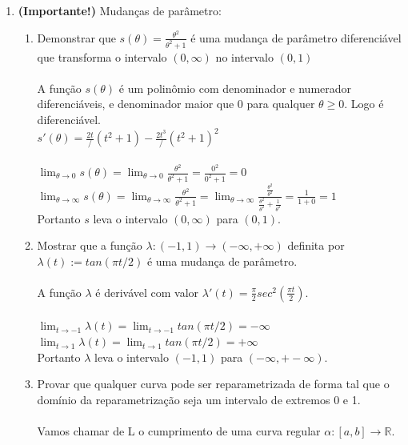 \documentclass{article}
\begin{document}
\begin{enumerate}
    \item \textbf{(Importante!)} Mudanças de parâmetro:
    \begin{enumerate}[label=(\alph*)]
        \item Demonstrar que $s(\theta) = \frac{\theta^{2}}{\theta^{2} + 1}$ é uma mudança de parâmetro diferenciável que transforma o intervalo $(0, \infty)$ no intervalo $(0, 1)$ \\
        \\
        A função $s(\theta)$ é um polinômio com denominador e numerador diferenciáveis, e denominador maior que 0 para qualquer $\theta \geq 0$. Logo é diferenciável. \\
        $s'(\theta) = \frac{2t}/{(t^{2} + 1)} - \frac{2t^{3}}/{(t^2 + 1)^{2}} $ \\
        \\
        $ \lim_{\theta \to 0} s(\theta) = \lim_{\theta \to 0} \frac{\theta^{2}}{\theta^{2} + 1} = \frac{0^{2}}{0^{2} + 1} = 0 $ \\
        $ \lim_{\theta \to \infty} s(\theta) = \lim_{\theta \to \infty} \frac{\theta^{2}}{\theta^{2} + 1} = \lim_{\theta \to \infty} \frac{\frac{\theta^{2}}{\theta^{2}}}{\frac{\theta^{2}}{\theta^{2}} + \frac{1}{\theta^{2}}} = \frac{1}{1+0} = 1 $ \\
        Portanto $s$ leva o intervalo $(0, \infty)$ para $(0, 1)$.
        \\
        \item Mostrar que a função $\lambda : (-1, 1) \to (-\infty, +\infty)$ definita por $\lambda(t) := tan(\pi t/2)$ é uma mudança de parâmetro. \\
        \\
        A função $\lambda$ é derivável com valor $\lambda'(t) = \frac{\pi}{2} sec^{2}(\frac{\pi t}{2})$. \\
        \\
        $ \lim_{t \to -1} \lambda(t) = \lim_{t \to -1} tan(\pi t/2) = -\infty $ \\
        $ \lim_{t \to 1} \lambda(t) = \lim_{t \to 1} tan(\pi t/2) = +\infty $ \\
        Portanto $\lambda$ leva o intervalo $(-1, 1)$ para $(-\infty, +-\infty)$.
        \\
        \item Provar que qualquer curva pode ser reparametrizada de forma tal que o domínio da reparametrização seja um intervalo de extremos 0 e 1. \\
        \\
        Vamos chamar de L o cumprimento de uma curva regular $\alpha: [a, b] \to \mathbb{R}$. \\

\end{enumerate}
\end{enumerate}
\end{document}
